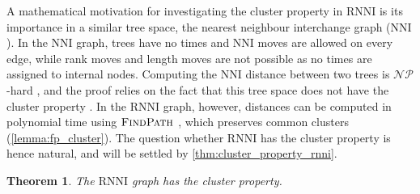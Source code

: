 \documentclass[11pt]{amsart}
\newtheorem{theorem}{Theorem}
\newcommand{\rnni}{\mathrm{RNNI}}
\newcommand{\findpath}{\textsc{FindPath}}
\newcommand{\nni}{\mathrm{NNI}}
\newcommand{\np}{\mathcal{NP}}
\newcommand{\summary}[1]{} %
\begin{document}
\summary{Cluster property in $\nni$ and its connection to the complexity result.}
A mathematical motivation for investigating the cluster property in $\rnni$ is its importance in a similar tree space, the nearest neighbour interchange graph ($\nni$).
In the $\nni$ graph, trees have no times and $\nni$ moves are allowed on every edge, while rank moves and length moves are not possible as no times are assigned to internal nodes.
Computing the $\nni$ distance between two trees is $\np$-hard \autocite{Dasgupta2000-xa}, and the proof relies on the fact that this tree space does not have the cluster property \autocite{Li1996-zw}.
In the $\rnni$ graph, however, distances can be computed in polynomial time using $\findpath$ \autocite{Collienne2021}, which preserves common clusters (\autoref{lemma:fp_cluster}).
The question whether $\rnni$ has the cluster property is hence natural, and will be settled by \autoref{thm:cluster_property_rnni}.


\summary{$\rnni$ has the cluster property.}
\begin{theorem}
	The $\rnni$ graph has the cluster property.
	\label{thm:cluster_property_rnni}
\end{theorem}
\end{document}
